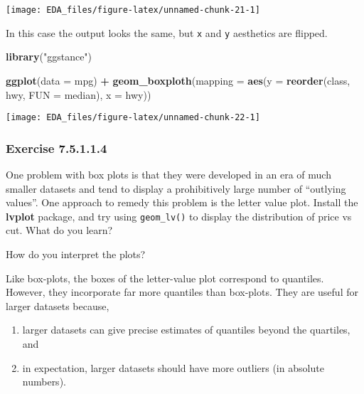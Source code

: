 \documentclass[]{book}
\newenvironment{Shaded}{\begin{snugshade}}{\end{snugshade}}
\newcommand{\DataTypeTok}[1]{\textcolor[rgb]{0.13,0.29,0.53}{#1}}
\newcommand{\KeywordTok}[1]{\textcolor[rgb]{0.13,0.29,0.53}{\textbf{#1}}}
\newcommand{\NormalTok}[1]{#1}
\newcommand{\OperatorTok}[1]{\textcolor[rgb]{0.81,0.36,0.00}{\textbf{#1}}}
\newcommand{\StringTok}[1]{\textcolor[rgb]{0.31,0.60,0.02}{#1}}
\providecommand{\tightlist}{%
  \setlength{\itemsep}{0pt}\setlength{\parskip}{0pt}}
\theoremstyle{plain}
\theoremstyle{remark}
\begin{document}
\begin{center}\texttt{[image: EDA\_files/figure-latex/unnamed-chunk-21-1]} \end{center}

In this case the output looks the same, but \texttt{x} and \texttt{y}
aesthetics are flipped.

\begin{Shaded}
\begin{Highlighting}[]
\KeywordTok{library}\NormalTok{(}\StringTok{"ggstance"}\NormalTok{)}

\KeywordTok{ggplot}\NormalTok{(}\DataTypeTok{data =}\NormalTok{ mpg) }\OperatorTok{+}
\StringTok{  }\KeywordTok{geom_boxploth}\NormalTok{(}\DataTypeTok{mapping =} \KeywordTok{aes}\NormalTok{(}\DataTypeTok{y =} \KeywordTok{reorder}\NormalTok{(class, hwy, }\DataTypeTok{FUN =}\NormalTok{ median), }\DataTypeTok{x =}\NormalTok{ hwy))}
\end{Highlighting}
\end{Shaded}

\begin{center}\texttt{[image: EDA\_files/figure-latex/unnamed-chunk-22-1]} \end{center}

\hypertarget{exercise-7.5.1.1.4}{%
\subsubsection*{\texorpdfstring{Exercise
{7.5.1.1.4}}{Exercise 7.5.1.1.4}}\label{exercise-7.5.1.1.4}}

One problem with box plots is that they were developed in an era of much
smaller datasets and tend to display a prohibitively large number of
``outlying values''. One approach to remedy this problem is the letter
value plot. Install the \textbf{lvplot} package, and try using
\texttt{geom\_lv()} to display the distribution of price vs cut. What do
you learn?

How do you interpret the plots?

Like box-plots, the boxes of the letter-value plot correspond to
quantiles. However, they incorporate far more quantiles than box-plots.
They are useful for larger datasets because,

\begin{enumerate}
\def\labelenumi{\arabic{enumi}.}
\tightlist
\item
  larger datasets can give precise estimates of quantiles beyond the
  quartiles, and
\item
  in expectation, larger datasets should have more outliers (in absolute
  numbers).
\end{enumerate}
\end{document}
